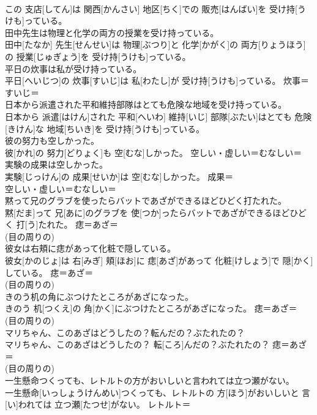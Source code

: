 \documentclass[8pt]{extreport}
\begin{document}
\begin{CJK}{UTF8}{min}
\\	この 支店[してん]は 関西[かんさい] 地区[ちく]での 販売[はんばい]を 受け持[うけも]っている。	
\\	田中先生は物理と化学の両方の授業を受け持っている。	
\\	田中[たなか] 先生[せんせい]は 物理[ぶつり]と 化学[かがく]の 両方[りょうほう]の 授業[じゅぎょう]を 受け持[うけも]っている。	
\\	平日の炊事は私が受け持っている。	
\\	平日[へいじつ]の 炊事[すいじ]は 私[わたし]が 受け持[うけも]っている。	炊事＝すいじ＝ 
\\	日本から派遣された平和維持部隊はとても危険な地域を受け持っている。	
\\	日本から 派遣[はけん]された 平和[へいわ] 維持[いじ] 部隊[ぶたい]はとても 危険[きけん]な 地域[ちいき]を 受け持[うけも]っている。	
\\	彼の努力も空しかった。	
\\	彼[かれ]の 努力[どりょく]も 空[むな]しかった。	空しい・虚しい＝むなしい＝ 
\\	実験の成果は空しかった。	
\\	実験[じっけん]の 成果[せいか]は 空[むな]しかった。	成果＝ 
\\	空しい・虚しい＝むなしい＝ 
\\	黙って兄のグラブを使ったらバットであざができるほどひどく打たれた。	
\\	黙[だま]って 兄[あに]のグラブを 使[つか]ったらバットであざができるほどひどく 打[う]たれた。	痣＝あざ＝ 
\\	(目の周りの) 
\\	彼女は右頬に痣があって化粧で隠している。	
\\	彼女[かのじょ]は 右[みぎ] 頬[ほお]に 痣[あざ]があって 化粧[けしょう]で 隠[かく]している。	痣＝あざ＝ 
\\	(目の周りの) 
\\	きのう机の角にぶつけたところがあざになった。	
\\	きのう 机[つくえ]の 角[かく]にぶつけたところがあざになった。	痣＝あざ＝ 
\\	(目の周りの) 
\\	マリちゃん、このあざはどうしたの？転んだの？ぶたれたの？	
\\	マリちゃん、このあざはどうしたの？ 転[ころ]んだの？ぶたれたの？	痣＝あざ＝ 
\\	(目の周りの) 
\\	一生懸命つくっても、レトルトの方がおいしいと言われては立つ瀬がない。	
\\	一生懸命[いっしょうけんめい]つくっても、レトルトの 方[ほう]がおいしいと 言[い]われては 立つ瀬[たつせ]がない。	レトルト＝ 

\end{CJK}
\end{document}
